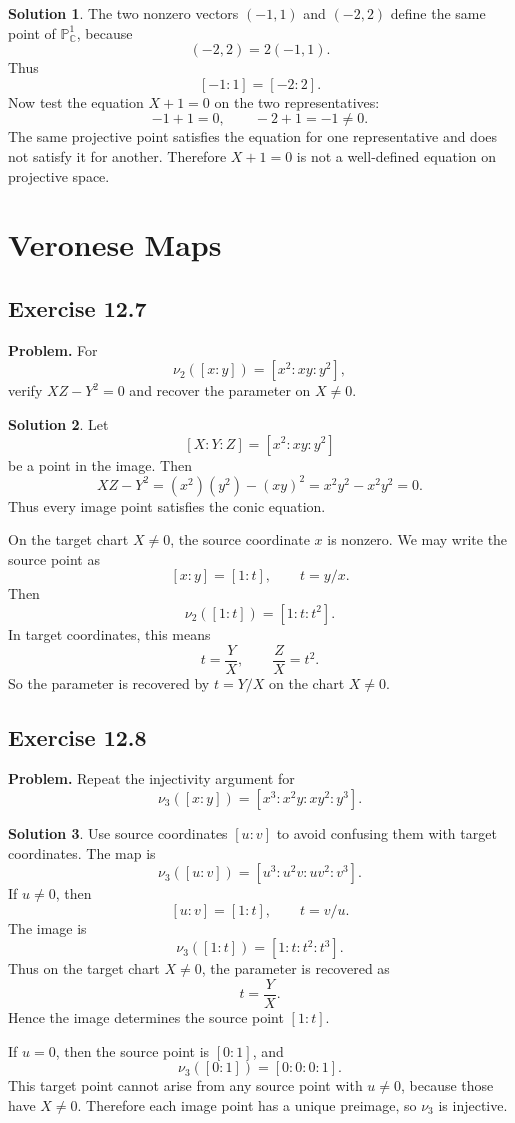 \documentclass[11pt]{article}
\theoremstyle{definition}
\newtheorem*{solution}{Solution}
\newcommand{\C}{\mathbb{C}}
\newcommand{\Pj}{\mathbb{P}}
\begin{document}
\begin{solution}
The two nonzero vectors \((-1,1)\) and \((-2,2)\) define the same point of
\(\Pj^1_{\C}\), because
\[
  (-2,2)=2(-1,1).
\]
Thus
\[
  [-1:1]=[-2:2].
\]
Now test the equation \(X+1=0\) on the two representatives:
\[
  -1+1=0,
  \qquad
  -2+1=-1\neq 0.
\]
The same projective point satisfies the equation for one representative and
does not satisfy it for another.  Therefore \(X+1=0\) is not a well-defined
equation on projective space.
\end{solution}

\section{Veronese Maps}

\subsection*{Exercise 12.7}
\textbf{Problem.}  For
\[
  \nu_2([x:y])=[x^2:xy:y^2],
\]
verify \(XZ-Y^2=0\) and recover the parameter on \(X\neq 0\).

\begin{solution}
Let
\[
  [X:Y:Z]=[x^2:xy:y^2]
\]
be a point in the image.  Then
\[
  XZ-Y^2=(x^2)(y^2)-(xy)^2=x^2y^2-x^2y^2=0.
\]
Thus every image point satisfies the conic equation.

On the target chart \(X\neq 0\), the source coordinate \(x\) is nonzero.  We
may write the source point as
\[
  [x:y]=[1:t],
  \qquad
  t=y/x.
\]
Then
\[
  \nu_2([1:t])=[1:t:t^2].
\]
In target coordinates, this means
\[
  t=\frac{Y}{X},
  \qquad
  \frac{Z}{X}=t^2.
\]
So the parameter is recovered by \(t=Y/X\) on the chart \(X\neq 0\).
\end{solution}

\subsection*{Exercise 12.8}
\textbf{Problem.}  Repeat the injectivity argument for
\[
  \nu_3([x:y])=[x^3:x^2y:xy^2:y^3].
\]

\begin{solution}
Use source coordinates \([u:v]\) to avoid confusing them with target
coordinates.  The map is
\[
  \nu_3([u:v])=[u^3:u^2v:uv^2:v^3].
\]
If \(u\neq 0\), then
\[
  [u:v]=[1:t],
  \qquad
  t=v/u.
\]
The image is
\[
  \nu_3([1:t])=[1:t:t^2:t^3].
\]
Thus on the target chart \(X\neq 0\), the parameter is recovered as
\[
  t=\frac{Y}{X}.
\]
Hence the image determines the source point \([1:t]\).

If \(u=0\), then the source point is \([0:1]\), and
\[
  \nu_3([0:1])=[0:0:0:1].
\]
This target point cannot arise from any source point with \(u\neq 0\), because
those have \(X\neq 0\).  Therefore each image point has a unique preimage, so
\(\nu_3\) is injective.
\end{solution}
\end{document}
